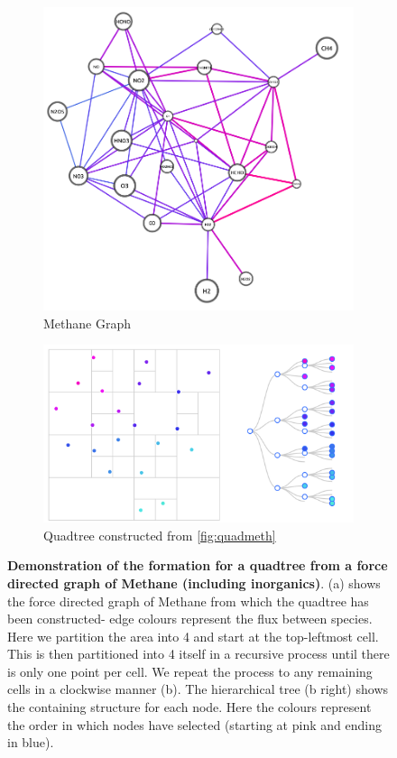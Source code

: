 \begin{figure}[H]
 \centering
    \begin{subfigure}[b]{.3\textwidth}
  \centering \includegraphics[width=\textwidth]{figures_c1/layout/methanequad.png}
  \caption{Methane Graph}
  \label{fig:quadmeth}
 \end{subfigure}
 \begin{subfigure}[b]{.6\textwidth}
  \centering \includegraphics[width=\textwidth]{figures_c1/layout/quad.png}
 \caption{Quadtree constructed from \autoref{fig:quadmeth}}
\label{fig:quadtree}
\end{subfigure}
\caption{ \textbf{Demonstration of the formation for a quadtree from a force directed graph of Methane (including inorganics)}. (a) shows the force directed graph of Methane from which the quadtree has been constructed- edge colours represent the flux between species. Here we partition the area into 4 and start at the top-leftmost cell. This is then partitioned into 4 itself in a recursive process until there is only one point per cell. We repeat the process to any remaining cells in a clockwise manner (b). The hierarchical tree (b right) shows the containing structure for each node. Here the colours represent the order in which nodes have selected (starting at pink and ending in blue). }
\label{fig:quadgroup}
\end{figure}

